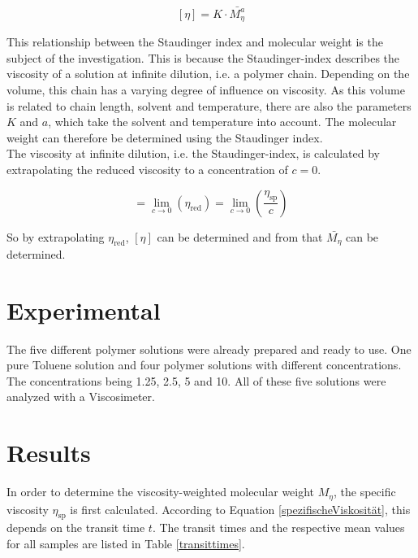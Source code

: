 \documentclass[10pt,a4paper,ngerman]{scrartcl}
\begin{document}
			\begin{equation}
				\label{ViskosiätsnummerundMolekulargewicht}
				[\eta] = K \cdot \bar{M_\eta^a}
			\end{equation}

		This relationship between the Staudinger index and molecular weight is the subject of the investigation. This is because the Staudinger-index describes the 
		viscosity of a solution at infinite dilution, i.e. a polymer chain. Depending on the volume, this chain has a varying degree of influence on viscosity. As this 
		volume is related to chain length, solvent and temperature, there are also the parameters $K$ and $a$, which take the solvent and temperature into account. The 
		molecular weight can therefore be determined using the Staudinger index.\\
		The viscosity at infinite dilution, i.e. the Staudinger-index, is calculated by extrapolating the reduced viscosity to a concentration of $c = 0$.

			\begin{equation}
				[\eta] = \lim_{c\rightarrow0} (\eta_\text{red}) =\lim_{c\rightarrow0} \left( \frac{\eta_\text{sp}}{c}\right) 
			\end{equation}
		

		So by extrapolating $\eta_\text{red}$, $[\eta]$ can be determined and from that $\bar{M_\eta}$ can be determined. \cite{polyskript}


\section{Experimental}

		The five different polymer solutions were already prepared and ready to use. 
		One pure Toluene solution and four polymer solutions with different concentrations. 
		The concentrations being \SI{1.25}{}, \SI{2.5}{}, \SI{5}{} and \SI{10}{}.
		All of these five solutions were analyzed with a Viscosimeter.

\section{Results}

		In order to determine the viscosity-weighted molecular weight $M_\eta$, the specific viscosity $\eta_\text{sp}$ is first calculated. 
		According to Equation \eqref{spezifischeViskosität}, this depends on the transit time $t$. The transit times and the respective mean 
		values for all samples are listed in Table \ref{transittimes}. 
		
\end{document}
